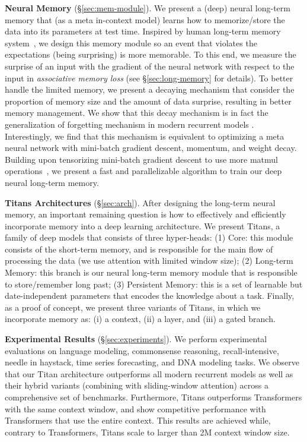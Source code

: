 \textcolor{c3}{\textbf{Neural Memory} (\S\ref{sec:mem-module})}.
We present a (deep) neural long-term memory that (as a meta in-context model) learns how to memorize/store the data into its parameters at test time. Inspired by human long-term memory system~\citep{mandler2014structure}, we design this memory module so an event that violates the expectations (being surprising) is more memorable. To this end, we measure the surprise of an input with the gradient of the neural network with respect to the input in \emph{associative memory loss} (\textcolor{c1}{see \S}\ref{sec:long-memory} \textcolor{c1}{for details}).  To better handle the limited memory, we present a decaying mechanism that consider the proportion of memory size and the amount of data surprise, resulting in better memory management. We show that this decay mechanism is in fact the generalization of forgetting mechanism in modern recurrent models \citep{dao2024transformers, yang2024gated, gu2024mamba}. Interestingly, we find that this mechanism is equivalent to optimizing a meta neural network with mini-batch gradient descent, momentum, and weight decay. Building upon tensorizing mini-batch gradient descent to use more matmul operations~\citep{sun2024learning}, we present a fast and parallelizable algorithm to train our deep neural long-term memory.

\noindent
\textcolor{c3}{\textbf{Titans Architectures} (\S\ref{sec:arch}).}
After designing the long-term neural memory, an important remaining question is how to effectively and efficiently incorporate memory into a deep learning architecture. We present Titans, a family of deep models that consists of three hyper-heads: (1) Core: this module consists of the short-term memory, and is responsible for the main flow of processing the data (we use attention with limited window size); (2) Long-term Memory: this branch is our neural long-term memory module that is responsible to store/remember long past; (3) Persistent Memory: this is a set of learnable but date-independent parameters that encodes the knowledge about a task. Finally, as a proof of concept, we present three variants of Titans, in which we incorporate memory as: (i) a context, (ii) a layer, and (iii) a gated branch. 




\textcolor{c3}{\textbf{Experimental Results} (\S\ref{sec:experiments})}.  
We perform experimental evaluations on language modeling, commonsense reasoning, recall-intensive, needle in haystack, time series forecasting, and DNA modeling tasks. We observe that our Titan architecture outperforms all modern recurrent models as well as their hybrid variants (combining with sliding-window attention) across a comprehensive set of benchmarks. Furthermore, Titans outperforms Transformers with the same context window, and show competitive performance with Transformers that use the entire context. This results are achieved while, contrary to Transformers, Titans scale to larger than 2M context window size.  
